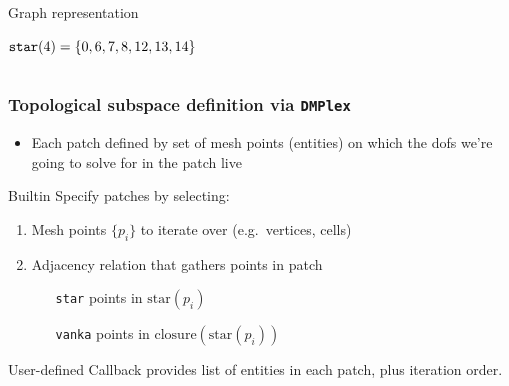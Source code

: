 \documentclass[presentation,aspectratio=43, 10pt]{beamer}
\begin{document}
\begin{frame}[t]
\begin{columns}[T]
\begin{column}{0.6\textwidth}
\begin{block}{Graph representation}
\begin{onlyenv}
\begin{center}
          \end{center}
          $\text{\texttt{star}}(4) = \{0, 6, 7, 8, 12, 13, 14\}$
        \end{onlyenv}
      \end{block}
    \end{column}
  \end{columns}
\end{frame}

\begin{frame}[fragile]
 \frametitle{Topological subspace definition via \texttt{DMPlex}}
 \begin{itemize}
 \item Each patch defined by set of mesh points (entities) on which the dofs
   we're going to solve for in the patch live
 \end{itemize}
 \begin{block}{Builtin}
   Specify patches by selecting:
   \begin{enumerate}
   \item Mesh points $\{p_i\}$ to iterate over (e.g.~vertices, cells)
   \item Adjacency relation that gathers points in patch
     \begin{itemize}
     \item[\texttt{star}] points in $\text{star}(p_i)$
     \item[\texttt{vanka}] points in $\text{closure}(\text{star}(p_i))$
     \end{itemize}
   \end{enumerate}
 \end{block}
 \begin{block}{User-defined}
   Callback provides list of entities in each patch, plus iteration order.
 \end{block}
\end{frame}
\end{document}
